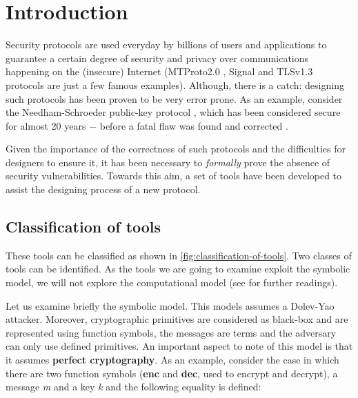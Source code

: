 
\section{Introduction}
\label{section:introduction}

Security protocols are used everyday by billions of users and applications to guarantee a certain degree of security and privacy over communications happening on the (insecure) Internet (MTProto2.0 \cite{Telegram-MTProto2.0}, Signal \cite{Signal} and TLSv1.3 \cite{TLSv1.3_specs} protocols are just a few famous examples). Although, there is a catch: designing such protocols has been proven to be very error prone. As an example, consider the Needham-Schroeder public-key protocol \cite{NSPK}, which has been considered secure for almost 20 years $-$ before a fatal flaw was found and corrected \cite{NSPK_LoweGavin}.

Given the importance of the correctness of such protocols and the difficulties for designers to ensure it, it has been necessary to \textit{formally} prove the absence of security vulnerabilities. Towards this aim, a set of tools have been developed to assist the designing process of a new protocol.

\subsection{Classification of tools}


These tools can be classified as shown in \cref{fig:classification-of-tools}. Two classes of tools can be identified. As the tools we are going to examine exploit the symbolic model, we will not explore the computational model (see \cite{ReconcilingComputationalSymbolic, 10.1007/978-3-540-31987-0_12, SymbolicComputationalBlanchet} for further readings). 

Let us examine briefly the symbolic model. This models assumes a Dolev-Yao \cite{Dolev-Yao} attacker. Moreover, cryptographic primitives are considered as black-box and are represented using function symbols, the messages are terms and the adversary can only use defined primitives. An important aspect to note of this model is that it assumes \textbf{perfect cryptography}. As an example, consider the case in which there are two function symbols (\textbf{enc} and \textbf{dec}, used to encrypt and decrypt), a message \textit{m} and a key \textit{k} and the following equality is defined:

